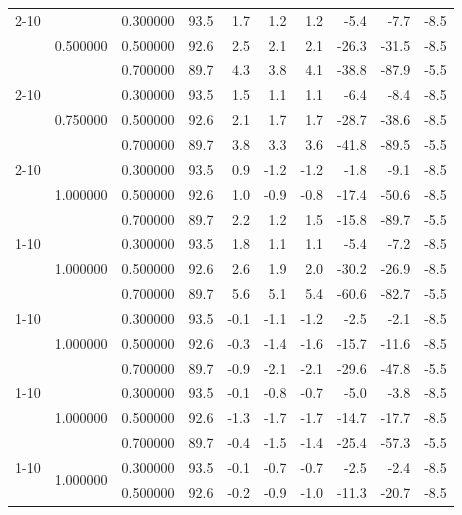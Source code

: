 \begin{tabular}{lllrrrrrrr}
\cline{2-10}
 & \multirow[t]{3}{*}{0.500000} & 0.300000 & 93.5 & 1.7 & 1.2 & 1.2 & -5.4 & -7.7 & -8.5 \\
 &  & 0.500000 & 92.6 & 2.5 & 2.1 & 2.1 & -26.3 & -31.5 & -8.5 \\
 &  & 0.700000 & 89.7 & 4.3 & 3.8 & 4.1 & -38.8 & -87.9 & -5.5 \\
\cline{2-10}
 & \multirow[t]{3}{*}{0.750000} & 0.300000 & 93.5 & 1.5 & 1.1 & 1.1 & -6.4 & -8.4 & -8.5 \\
 &  & 0.500000 & 92.6 & 2.1 & 1.7 & 1.7 & -28.7 & -38.6 & -8.5 \\
 &  & 0.700000 & 89.7 & 3.8 & 3.3 & 3.6 & -41.8 & -89.5 & -5.5 \\
\cline{2-10}
 & \multirow[t]{3}{*}{1.000000} & 0.300000 & 93.5 & 0.9 & -1.2 & -1.2 & -1.8 & -9.1 & -8.5 \\
 &  & 0.500000 & 92.6 & 1.0 & -0.9 & -0.8 & -17.4 & -50.6 & -8.5 \\
 &  & 0.700000 & 89.7 & 2.2 & 1.2 & 1.5 & -15.8 & -89.7 & -5.5 \\
\cline{1-10} \cline{2-10}
\multirow[t]{3}{*}{independent} & \multirow[t]{3}{*}{1.000000} & 0.300000 & 93.5 & 1.8 & 1.1 & 1.1 & -5.4 & -7.2 & -8.5 \\
 &  & 0.500000 & 92.6 & 2.6 & 1.9 & 2.0 & -30.2 & -26.9 & -8.5 \\
 &  & 0.700000 & 89.7 & 5.6 & 5.1 & 5.4 & -60.6 & -82.7 & -5.5 \\
\cline{1-10} \cline{2-10}
\multirow[t]{3}{*}{llm:always\_wrong} & \multirow[t]{3}{*}{1.000000} & 0.300000 & 93.5 & -0.1 & -1.1 & -1.2 & -2.5 & -2.1 & -8.5 \\
 &  & 0.500000 & 92.6 & -0.3 & -1.4 & -1.6 & -15.7 & -11.6 & -8.5 \\
 &  & 0.700000 & 89.7 & -0.9 & -2.1 & -2.1 & -29.6 & -47.8 & -5.5 \\
\cline{1-10} \cline{2-10}
\multirow[t]{3}{*}{llm:rushing} & \multirow[t]{3}{*}{1.000000} & 0.300000 & 93.5 & -0.1 & -0.8 & -0.7 & -5.0 & -3.8 & -8.5 \\
 &  & 0.500000 & 92.6 & -1.3 & -1.7 & -1.7 & -14.7 & -17.7 & -8.5 \\
 &  & 0.700000 & 89.7 & -0.4 & -1.5 & -1.4 & -25.4 & -57.3 & -5.5 \\
\cline{1-10} \cline{2-10}
\multirow[t]{3}{*}{llm:semantic\_hallucination} & \multirow[t]{3}{*}{1.000000} & 0.300000 & 93.5 & -0.1 & -0.7 & -0.7 & -2.5 & -2.4 & -8.5 \\
 &  & 0.500000 & 92.6 & -0.2 & -0.9 & -1.0 & -11.3 & -20.7 & -8.5 \\

\end{tabular}
